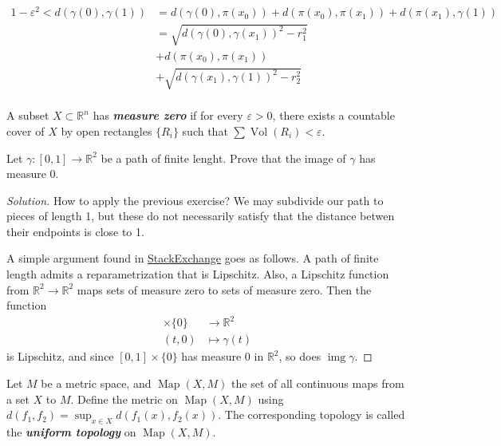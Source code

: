 \documentclass{article}
\newcommand{\R}{\mathbb{R}}
\DeclareMathOperator{\img}{img}
\DeclareMathOperator{\Map}{Map}
\DeclareMathOperator{\Vol}{Vol}
\begin{document}
	\begin{align*}
		1-\varepsilon^2<d(\gamma(0),\gamma(1))&=d(\gamma(0),\pi(x_0))+d(\pi(x_0),\pi(x_1))+d(\pi(x_1),\gamma(1))\\
		&=\sqrt{d(\gamma(0),\gamma(x_1))^2-r_1^2}\\
		&+d(\pi(x_0),\pi(x_1))\\
		&+\sqrt{d(\gamma(x_1),\gamma(1))^2-r_2^2}\\
	\end{align*}\fi
\begin{defn}
	A subset $X\subset \R^n$ has \textbf{\textit{measure zero}} if for every $\varepsilon > 0$, there exists a countable cover of $X$ by open rectangles $\{R_i\}$ such that $\sum\Vol(R_i)<\varepsilon$.
\end{defn}
\begin{exercise}
	Let $\gamma:[0,1]\to\R^2$ be a path of finite lenght. Prove that the image of $\gamma$ has measure 0.
\end{exercise}
\begin{proof}[Solution]
	{\color{red}How to apply the previous exercise? We may subdivide our path to pieces of length 1, but these do not necessarily satisfy that the distance betwen their endpoints is close to 1.}
	
	A simple argument found in \href{https://math.stackexchange.com/questions/2106497/fa-b-has-measure-zero/}{StackExchange} goes as follows. A path of finite length admits a reparametrization that is Lipschitz. Also, a Lipschitz function from $\R^2\to\R^2$ maps sets of measure zero to sets of measure zero. Then the function
	\begin{align*}
		[0,1]\times\{0\}&\to\R^2\\
		(t,0)&\mapsto\gamma(t)
	\end{align*}
	is Lipschitz, and since $[0,1]\times\{0\}$ has measure 0 in $\R^2$, so does $\img\gamma$.
	

\end{proof}
\begin{defn}
	Let $M$ be a metric space, and $\Map(X,M)$ the set of all continuous maps from a set $X$ to $M$. Define the metric on $\Map(X,M)$ using $d(f_1,f_2) = \sup_{x\in X} d(f_1(x), f_2(x))$. The corresponding topology is called the \textbf{\textit{uniform topology}} on $\Map(X,M)$.
\end{defn}
\end{document}
